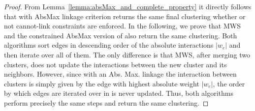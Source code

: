 \begin{proof}%
From Lemma~\ref{lemma:absMax_and_complete_property} it directly follows that \algname{} with AbsMax linkage criterion returns the same final clustering whether or not cannot-link constraints are enforced. In the following, we prove that MWS and the constrained AbsMax version of \algname{} also return the same clustering.
Both algorithms sort edges in descending order of the absolute interactions $|w_e|$ and then iterate over all of them. The only difference is that MWS, after merging two clusters, does not update the interactions between the new cluster and its neighbors. 
However, since with an Abs. Max. linkage the interaction between clusters is simply given by the edge with highest absolute weight $|w_e|$, the order by which edges are iterated over in \algname{} is never updated. Thus, both algorithms perform precisely the same steps and return the same clustering.
\end{proof}

